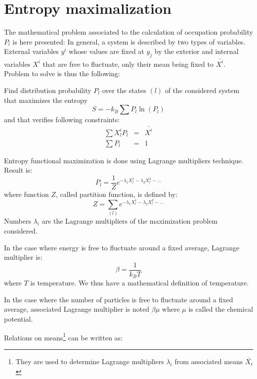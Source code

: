 \documentclass[12pt]{book}
\begin{document}
\section{Entropy maximalization}\label{secmaxient}
The mathematical problem associated to the calculation of occupation
probability $P_l$ is here presented:
In general, a system is described by two types of variables. External
variables $y^i$ whose values are fixed at $y_j$ by the exterior and internal
variables $X^i$ that are free to fluctuate, only their mean being fixed to
$\bar{X^i}$. Problem to solve is thus the following:
\begin{prob}
Find distribution probability $P_l$ over the states $(l)$ of the
considered system 
that maximizes the entropy
\begin{equation}
S=-k_B\sum P_l \ln (P_l)
\end{equation}
and that verifies following constraints:
\begin{eqnarray}
\sum X_{l}^iP_l&=&\bar{X^i}\\
\sum P_l&=&1
\end{eqnarray}
\end{prob}
Entropy functional maximization is done using Lagrange multipliers
technique. Result is:
\begin{equation}
P_l=\frac{1}{Z}e^{-\lambda_1 X^{1}_l-\lambda_2 X^{2}_l- ...}
\end{equation}
where function $Z$, called partition function,
is
defined by:
\begin{equation}
Z=\sum_{(l)} e^{-\lambda_1 X^{1}_l-\lambda_2 X^{2}_l- ...}
\end{equation}
Numbers $\lambda_i$ are the Lagrange multipliers of the maximization problem
considered.
\begin{exmp}
In the case where energy is free to fluctuate around a fixed average, Lagrange
multiplier is:
\begin{equation}
\beta=\frac{1}{k_BT}
\end{equation}
where $T$ is temperature. We thus have a mathematical
definition of temperature.
\end{exmp}
\begin{exmp}
In the case where the number of particles is free to fluctuate around a fixed
average, associated Lagrange multiplier is noted $\beta\mu$ where $\mu$ is
called the chemical potential.
\end{exmp}
Relations on means\footnote{They are used to determine Lagrange multipliers
$\lambda_i$ from associated means $\bar{X_i}$} can be written as:
\end{document}
